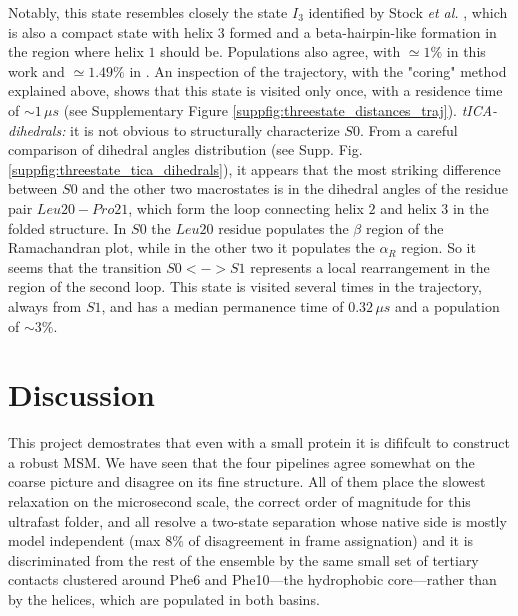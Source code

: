 \documentclass[prl,twocolumn]{revtex4-1}
\begin{document}
Notably, this state resembles closely the state $I_3$ identified by Stock \textit{et al.} \cite{hierarchical_hp35}, which is also a compact state with helix $3$ formed and a beta-hairpin-like formation in the region where helix $1$ should be. Populations also agree, with $\simeq 1\%$ in this work and $\simeq 1.49\%$ in \cite{hierarchical_hp35}. An inspection of the trajectory, with the "coring" method explained above,  shows that this state is visited only once, with a residence time of $\sim 1\,\mu s$ (see Supplementary Figure \ref{suppfig:threestate_distances_traj}). 
\vspace*{0.1em}\newline
\textit{tICA-dihedrals:} it is not obvious to structurally characterize $S0$. From a careful comparison of dihedral angles distribution (see Supp. Fig. \ref{suppfig:threestate_tica_dihedrals}), it appears that the
most striking difference between $S0$ and the other two macrostates is in the dihedral angles of the residue pair $Leu20-Pro21$, which form the loop connecting helix $2$ and helix $3$ in the folded structure. In $S0$ the $Leu20$ residue populates the $\beta$ region of the Ramachandran plot, while in the
other two it populates the $\alpha_R$ region. So it seems that the transition  $S0<->S1$ represents a local rearrangement in the region of the second loop. This state is visited several times in the trajectory, always from $S1$, and has a median permanence time of $0.32\, \mu s$ and a population of $\sim 3\%$. 
%
%
%
%
%
%
%
%
%
\section{Discussion}
This project demostrates that even with a small protein it is dififcult to construct a 
robust MSM. We have seen that the four pipelines agree somewhat on the coarse picture and
disagree on its fine structure. All of them place the slowest relaxation
on the microsecond scale, the correct order of magnitude for this
ultrafast folder, and all resolve a two-state separation whose native
side is mostly model independent (max $8\%$ of disagreement in frame assignation) and it is discriminated from the
rest of the ensemble by the same small set of tertiary contacts
clustered around Phe6 and Phe10---the hydrophobic core---rather than by
the helices, which are populated in both basins. 
\end{document}
